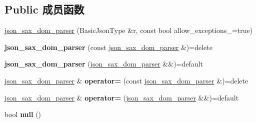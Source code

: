 \subsection*{Public 成员函数}
\begin{DoxyCompactItemize}
\item 
\mbox{\hyperlink{classnlohmann_1_1detail_1_1json__sax__dom__parser_afc50fee0a92ce84afb84041ebbdfba80}{json\+\_\+sax\+\_\+dom\+\_\+parser}} (Basic\+Json\+Type \&r, const bool allow\+\_\+exceptions\+\_\+=true)
\item 
\mbox{\label{classnlohmann_1_1detail_1_1json__sax__dom__parser_a0a00cd158d678e294f6e974cd9373c4b}} 
{\bfseries json\+\_\+sax\+\_\+dom\+\_\+parser} (const \mbox{\hyperlink{classnlohmann_1_1detail_1_1json__sax__dom__parser}{json\+\_\+sax\+\_\+dom\+\_\+parser}} \&)=delete
\item 
\mbox{\label{classnlohmann_1_1detail_1_1json__sax__dom__parser_ad6e588652d5a9cb647a3c32a6221f13e}} 
{\bfseries json\+\_\+sax\+\_\+dom\+\_\+parser} (\mbox{\hyperlink{classnlohmann_1_1detail_1_1json__sax__dom__parser}{json\+\_\+sax\+\_\+dom\+\_\+parser}} \&\&)=default
\item 
\mbox{\label{classnlohmann_1_1detail_1_1json__sax__dom__parser_a98448bf2cbc15d15e2eddc5a09a40a42}} 
\mbox{\hyperlink{classnlohmann_1_1detail_1_1json__sax__dom__parser}{json\+\_\+sax\+\_\+dom\+\_\+parser}} \& {\bfseries operator=} (const \mbox{\hyperlink{classnlohmann_1_1detail_1_1json__sax__dom__parser}{json\+\_\+sax\+\_\+dom\+\_\+parser}} \&)=delete
\item 
\mbox{\label{classnlohmann_1_1detail_1_1json__sax__dom__parser_aff928a07e40e4efb16b3ff9384f4401c}} 
\mbox{\hyperlink{classnlohmann_1_1detail_1_1json__sax__dom__parser}{json\+\_\+sax\+\_\+dom\+\_\+parser}} \& {\bfseries operator=} (\mbox{\hyperlink{classnlohmann_1_1detail_1_1json__sax__dom__parser}{json\+\_\+sax\+\_\+dom\+\_\+parser}} \&\&)=default
\item 
\mbox{\label{classnlohmann_1_1detail_1_1json__sax__dom__parser_abb06babaa861f123d8d0cb443b887d8a}} 
bool {\bfseries null} ()
\item 

\end{DoxyCompactItemize}
